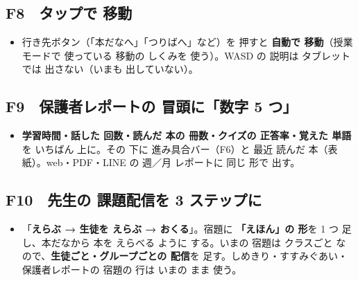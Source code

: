 \documentclass[a4paper,10pt]{article}
\begin{document}
\subsection{F8　タップで 移動}
\begin{itemize}
\item 行き先ボタン（「本だなへ」「つりばへ」など）を 押すと \textbf{自動で 移動}（授業モードで 使っている 移動の しくみを 使う）。WASD の 説明は タブレットでは 出さない（いまも 出していない）。
\end{itemize}

\subsection{F9　保護者レポートの 冒頭に「数字 5 つ」}
\begin{itemize}
\item \textbf{学習時間・話した 回数・読んだ 本の 冊数・クイズの 正答率・覚えた 単語}を いちばん 上に。その 下に 進み具合バー（F6）と 最近 読んだ 本（表紙）。web・PDF・LINE の 週／月 レポートに 同じ 形で 出す。
\end{itemize}

\subsection{F10　先生の 課題配信を 3 ステップに}
\begin{itemize}
\item 「\textbf{えらぶ → 生徒を えらぶ → おくる}」。宿題に \textbf{「えほん」の 形}を 1 つ 足し、本だなから 本を えらべる ように する。いまの 宿題は クラスごと なので、\textbf{生徒ごと・グループごとの 配信}を 足す。しめきり・すすみぐあい・保護者レポートの 宿題の 行は いまの まま 使う。
\end{itemize}
\end{document}
